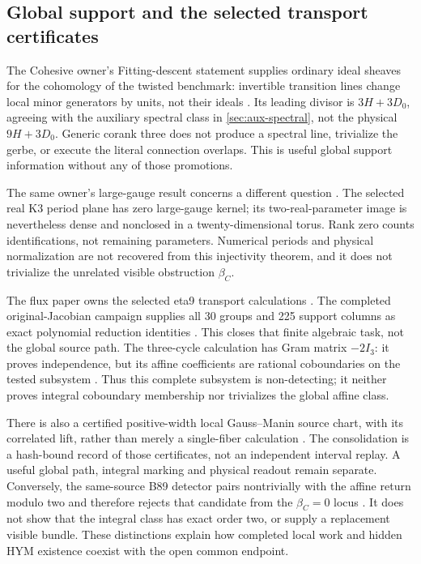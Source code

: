 \documentclass[11pt]{article}
\theoremstyle{definition}
\theoremstyle{remark}
\begin{document}
\subsection{Global support and the selected transport certificates}
\label{sec:consumer-global}

The Cohesive owner's Fitting-descent statement supplies ordinary ideal
sheaves for the cohomology of the twisted benchmark: invertible transition
lines change local minor generators by units, not their ideals
\cite{NeroCohesive2026,ConsumerFitting}. Its leading divisor is
\(3H+3D_0\), agreeing with the auxiliary spectral class in
\cref{sec:aux-spectral}, not the physical \(9H+3D_0\). Generic corank three
does not produce a spectral line, trivialize the gerbe, or execute the
literal connection overlaps. This is useful global support information
without any of those promotions.

The same owner's large-gauge result concerns a different question
\cite{ConsumerBK3}. The selected real K3 period plane has zero
large-gauge kernel; its two-real-parameter image is nevertheless dense
and nonclosed in a twenty-dimensional torus. Rank zero counts
identifications, not remaining parameters. Numerical periods and physical
normalization are not recovered from this injectivity theorem, and it
does not trivialize the unrelated visible obstruction \(\beta_C\).

The flux paper owns the selected eta9 transport calculations
\cite{NeroFlux2026}. The completed original-Jacobian campaign supplies
all 30 groups and 225 support columns as exact polynomial reduction
identities \cite{ConsumerGateOne}. This closes that finite algebraic
task, not the global source path. The three-cycle calculation has
Gram matrix \(-2I_3\): it proves independence, but its affine coefficients
are rational coboundaries on the tested subsystem
\cite{ConsumerThreeCycle}. Thus this complete subsystem is
non-detecting; it neither proves integral coboundary membership nor
trivializes the global affine class.

There is also a certified positive-width local Gauss--Manin source chart,
with its correlated lift, rather than merely a single-fiber calculation
\cite{ConsumerTube}. The consolidation is a hash-bound record of those
certificates, not an independent interval replay. A useful global path,
integral marking and physical readout remain separate. Conversely, the
same-source B89 detector pairs nontrivially with the affine return modulo
two and therefore rejects that candidate from the \(\beta_C=0\) locus
\cite{ConsumerB89}. It does not show that the integral class has exact
order two, or supply a replacement visible bundle. These distinctions
explain how completed local work and hidden HYM existence coexist with
the open common endpoint.
\end{document}
